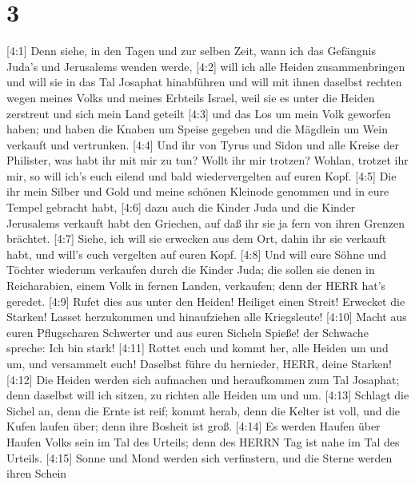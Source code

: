 \hypertarget{section-2}{%
\section{3}\label{section-2}}

 {[}4:1{]} Denn siehe, in den Tagen und zur selben Zeit,
wann ich das Gefängnis Juda's und Jerusalems wenden werde, 
{[}4:2{]} will ich alle Heiden zusammenbringen und will sie in das Tal
Josaphat hinabführen und will mit ihnen daselbst rechten wegen meines
Volks und meines Erbteils Israel, weil sie es unter die Heiden zerstreut
und sich mein Land geteilt  {[}4:3{]} und das Los um mein
Volk geworfen haben; und haben die Knaben um Speise gegeben und die
Mägdlein um Wein verkauft und vertrunken.  {[}4:4{]} Und ihr
von Tyrus und Sidon und alle Kreise der Philister, was habt ihr mit mir
zu tun? Wollt ihr mir trotzen? Wohlan, trotzet ihr mir, so will ich's
euch eilend und bald wiedervergelten auf euren Kopf. 
{[}4:5{]} Die ihr mein Silber und Gold und meine schönen Kleinode
genommen und in eure Tempel gebracht habt,  {[}4:6{]} dazu
auch die Kinder Juda und die Kinder Jerusalems verkauft habt den
Griechen, auf daß ihr sie ja fern von ihren Grenzen brächtet.
 {[}4:7{]} Siehe, ich will sie erwecken aus dem Ort, dahin
ihr sie verkauft habt, und will's euch vergelten auf euren Kopf.
 {[}4:8{]} Und will eure Söhne und Töchter wiederum
verkaufen durch die Kinder Juda; die sollen sie denen in Reicharabien,
einem Volk in fernen Landen, verkaufen; denn der HERR hat's geredet.
 {[}4:9{]} Rufet dies aus unter den Heiden! Heiliget einen
Streit! Erwecket die Starken! Lasset herzukommen und hinaufziehen alle
Kriegsleute!  {[}4:10{]} Macht aus euren Pflugscharen
Schwerter und aus euren Sicheln Spieße! der Schwache spreche: Ich bin
stark!  {[}4:11{]} Rottet euch und kommt her, alle Heiden
um und um, und versammelt euch! Daselbst führe du hernieder, HERR, deine
Starken!  {[}4:12{]} Die Heiden werden sich aufmachen und
heraufkommen zum Tal Josaphat; denn daselbst will ich sitzen, zu richten
alle Heiden um und um.  {[}4:13{]} Schlagt die Sichel an,
denn die Ernte ist reif; kommt herab, denn die Kelter ist voll, und die
Kufen laufen über; denn ihre Bosheit ist groß.  {[}4:14{]}
Es werden Haufen über Haufen Volks sein im Tal des Urteils; denn des
HERRN Tag ist nahe im Tal des Urteils.  {[}4:15{]} Sonne
und Mond werden sich verfinstern, und die Sterne werden ihren Schein
